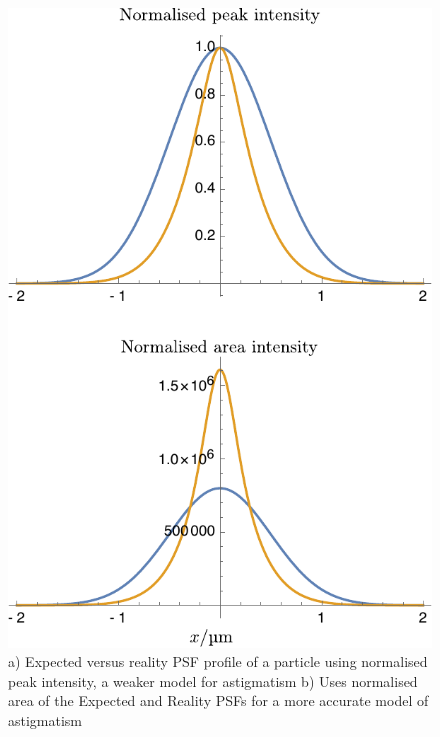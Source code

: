 \begin{figure}
  \centering
  \includegraphics{./mathematica/guassians}
  \caption{a) Expected versus reality PSF profile of a particle using normalised peak intensity, a weaker model for astigmatism
  b) Uses normalised area of the Expected and Reality PSFs for a more accurate model of astigmatism}
  \label{}
\end{figure}

